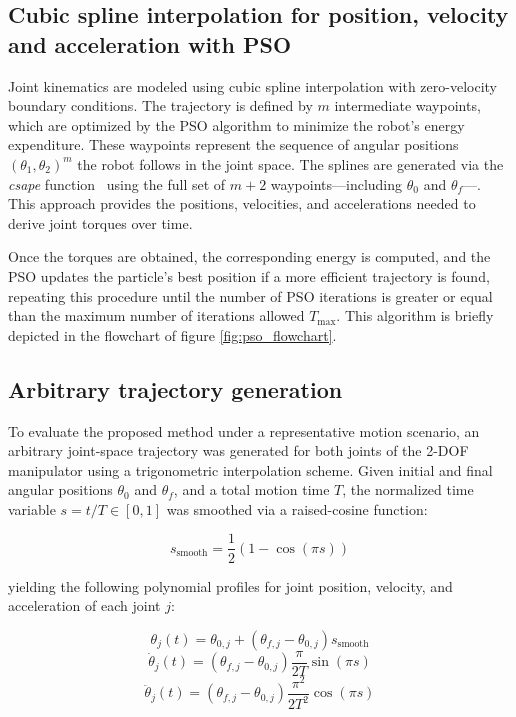 \documentclass[runningheads]{llncs}
\begin{document}
\subsection{Cubic spline interpolation for position, velocity and acceleration with PSO}
Joint kinematics are modeled using cubic spline interpolation with zero-velocity boundary conditions. The trajectory is defined by $m$ intermediate waypoints, which are optimized by the PSO algorithm to minimize the robot's energy expenditure. These waypoints represent the sequence of angular positions $(\theta_1, \theta_2)^m$ the robot follows in the joint space. The splines are generated via the \textit{csape} function~\cite{ref_csape} using the full set of $m+2$ waypoints---including $\theta_0$ and $\theta_f$---. This approach provides the positions, velocities, and accelerations needed to derive joint torques over time.

Once the torques are obtained, the corresponding energy is computed, and the PSO updates the particle's best position if a more efficient trajectory is found, repeating this procedure until the number of PSO iterations is greater or equal than the maximum number of iterations allowed $T_{\max}$. This algorithm is briefly depicted in the flowchart of figure \ref{fig:pso_flowchart}.

\subsection{Arbitrary trajectory generation}

To evaluate the proposed method under a representative motion scenario, an arbitrary joint-space trajectory was generated for both joints of the 2-DOF manipulator using a trigonometric interpolation scheme. Given initial and final angular positions $\theta_0$ and $\theta_f$, and a total motion time $T$, the normalized time variable $s = t/T \in [0,1]$ was smoothed via a raised-cosine function:

\begin{equation}
    s_{\text{smooth}}=\frac{1}{2}(1-\cos(\pi s))
\end{equation}

yielding the following polynomial profiles for joint position, velocity, and acceleration of each joint $j$:

\begin{equation}
    \theta_j(t)=\theta_{0,j}+(\theta_{f,j}-\theta_{0,j})s_{\text{smooth}}
\end{equation}
\begin{equation}
    \dot \theta_j(t)=(\theta_{f,j}-\theta_{0,j})\frac{\pi}{2T}\sin(\pi s)
\end{equation}
\begin{equation}
    \ddot \theta_j(t)=(\theta_{f,j}-\theta_{0,j})\frac{\pi^2}{2T^2}\cos(\pi s)
\end{equation}
\end{document}
